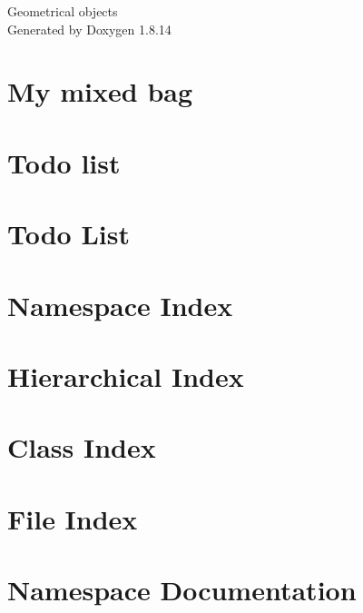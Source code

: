\documentclass[twoside]{book}
\newcommand{\+}{\discretionary{\mbox{\scriptsize$\hookleftarrow$}}{}{}}
\newcommand{\clearemptydoublepage}{%
  \newpage{\pagestyle{empty}\cleardoublepage}%
}
\begin{document}
\hypersetup{pageanchor=false,
             bookmarksnumbered=true,
             pdfencoding=unicode
            }
\begin{titlepage}
\vspace*{7cm}
\begin{center}%
{\Large Geometrical objects }\\
\vspace*{1cm}
{\large Generated by Doxygen 1.8.14}\\
\end{center}
\end{titlepage}
\clearemptydoublepage
{}
\tableofcontents
\clearemptydoublepage
{}
\hypersetup{pageanchor=true}

\chapter{My mixed bag}
\label{md_README}

\chapter{Todo list}
\label{md_TODO}

\chapter{Todo List}
\label{todo}

\chapter{Namespace Index}

\chapter{Hierarchical Index}

\chapter{Class Index}

\chapter{File Index}

\chapter{Namespace Documentation}




\end{document}
